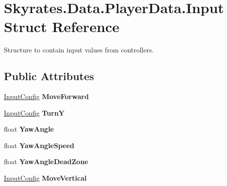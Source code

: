 \hypertarget{struct_skyrates_1_1_data_1_1_player_data_1_1_input}{\section{Skyrates.\-Data.\-Player\-Data.\-Input Struct Reference}
\label{struct_skyrates_1_1_data_1_1_player_data_1_1_input}
}


Structure to contain input values from controllers.  


\subsection*{Public Attributes}
\begin{DoxyCompactItemize}
\item 
\hypertarget{struct_skyrates_1_1_data_1_1_player_data_1_1_input_ab56219eda31d06a0606d9c76a83e37bc}{\hyperlink{class_skyrates_1_1_data_1_1_player_data_1_1_input_config}{Input\-Config} {\bfseries Move\-Forward}}\label{struct_skyrates_1_1_data_1_1_player_data_1_1_input_ab56219eda31d06a0606d9c76a83e37bc}

\item 
\hypertarget{struct_skyrates_1_1_data_1_1_player_data_1_1_input_a3a4b75f1db59c82f087853a416274b4e}{\hyperlink{class_skyrates_1_1_data_1_1_player_data_1_1_input_config}{Input\-Config} {\bfseries Turn\-Y}}\label{struct_skyrates_1_1_data_1_1_player_data_1_1_input_a3a4b75f1db59c82f087853a416274b4e}

\item 
\hypertarget{struct_skyrates_1_1_data_1_1_player_data_1_1_input_a0acf22da41e6f2d6fcb6a5230a95f26e}{float {\bfseries Yaw\-Angle}}\label{struct_skyrates_1_1_data_1_1_player_data_1_1_input_a0acf22da41e6f2d6fcb6a5230a95f26e}

\item 
\hypertarget{struct_skyrates_1_1_data_1_1_player_data_1_1_input_a45c1397bc281b879221c0fe8818e8161}{float {\bfseries Yaw\-Angle\-Speed}}\label{struct_skyrates_1_1_data_1_1_player_data_1_1_input_a45c1397bc281b879221c0fe8818e8161}

\item 
\hypertarget{struct_skyrates_1_1_data_1_1_player_data_1_1_input_a4b9162afd95bd146b4394d3c128da45f}{float {\bfseries Yaw\-Angle\-Dead\-Zone}}\label{struct_skyrates_1_1_data_1_1_player_data_1_1_input_a4b9162afd95bd146b4394d3c128da45f}

\item 
\hypertarget{struct_skyrates_1_1_data_1_1_player_data_1_1_input_acf6b51aec5583119ae84a6977fe3e484}{\hyperlink{class_skyrates_1_1_data_1_1_player_data_1_1_input_config}{Input\-Config} {\bfseries Move\-Vertical}}\label{struct_skyrates_1_1_data_1_1_player_data_1_1_input_acf6b51aec5583119ae84a6977fe3e484}


\end{DoxyCompactItemize}
